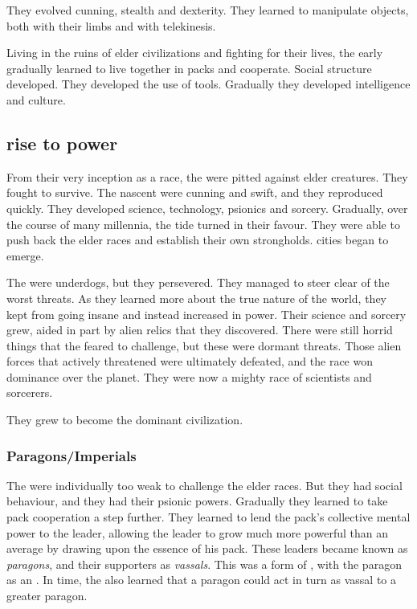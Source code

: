 They evolved cunning, stealth and dexterity. 
They learned to manipulate objects, both with their limbs and with telekinesis. 

Living in the ruins of elder civilizations and fighting for their lives, the early \ophidians gradually learned to live together in packs and cooperate. 
Social structure developed. 
They developed the use of tools. 
Gradually they developed intelligence and culture. 









\subsection{\Ophidian rise to power}
From their very inception as a race, the \ophidians were pitted against elder creatures. 
They fought to survive. 
The nascent \ophidians were cunning and swift, and they reproduced quickly. 
They developed science, technology, psionics and sorcery.
Gradually, over the course of many millennia, the tide turned in their favour. 
They were able to push back the elder races and establish their own strongholds.
\Ophidian cities began to emerge. 

The \ophidians were underdogs, but they persevered. 
They managed to steer clear of the worst threats. 
As they learned more about the true nature of the world, they kept from going insane and instead increased in power. 
Their science and sorcery grew, aided in part by alien relics that they discovered. 
There were still horrid things that the \ophidians feared to challenge, but these were dormant threats. 
Those alien forces that actively threatened were ultimately defeated, and the \ophidian race won dominance over the planet. 
They were now a mighty race of scientists and sorcerers.

They grew to become the dominant civilization. 





\subsubsection{Paragons/Imperials}
The \ophidians were individually too weak to challenge the elder races. 
But they had social behaviour, and they had their psionic powers. 
Gradually they learned to take pack cooperation a step further. 
They learned to lend the pack's collective mental power to the leader, allowing the leader to grow much more powerful than an average \ophidian by drawing upon the essence of his pack.
These leaders became known as \emph{paragons}, and their supporters as \emph{vassals}.
This was a form of \emph{\nexus}, with the paragon as an \emph{\apex}. 
In time, the \ophidians also learned that a paragon could act in turn as vassal to a greater paragon. 

